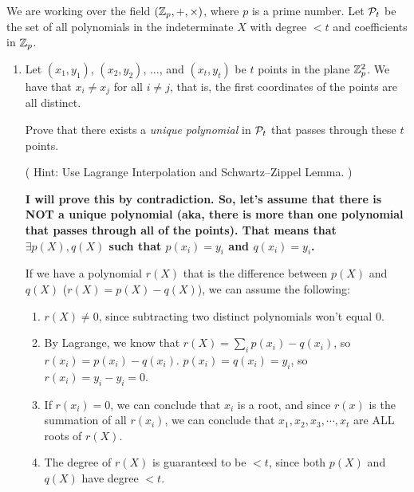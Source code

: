 \documentclass[11pt]{article}
\begin{document}
\begin{enumerate}
  We are working over the field $({\mathbb Z}_p,+,\times)$, where $p$ is a prime number. 
  Let ${\mathcal P}_t$ be the set of all polynomials in the indeterminate $X$ with degree $<t$ and coefficients in ${\mathbb Z}_p$. 
  
  \begin{enumerate}
  \item Let $(x_1,y_1)$, $(x_2,y_2)$, $\dotsc$, and $(x_t,y_t)$ be $t$ points in the plane ${\mathbb Z}_p^2$. 
    We have that $x_i \neq x_j$ for all $i\neq j$, that is, the first coordinates of the points are all distinct. 
    
    Prove that there exists a {\em unique polynomial} in ${\mathcal P}_t$ that passes through these $t$ points. 
    
    ({\footnotesize
      Hint: 
        Use Lagrange Interpolation and Schwartz--Zippel Lemma. 
    }%
    )\newline 
    {\bfseries
    \newline
    \newline
      I will prove this by contradiction. So, let's assume that there is NOT a unique polynomial (aka, there is more than one polynomial that passes through all of the points). That means that $\exists p(X), q(X)$ such that $p(x_i)=y_i$ and $q(x_i)=y_i$. \newline

      If we have a polynomial $r(X)$ that is the difference between $p(X)$ and $q(X)$ ($r(X) = p(X) - q(X)$), we can assume the following: \newline
      \begin{enumerate}
        \item $r(X) \neq 0$, since subtracting two distinct polynomials won't equal 0. \newline
        \item By Lagrange, we know that $r(X) = \sum_{i} p(x_i) - q(x_i)$, so $r(x_i) = p(x_i)-q(x_i)$. $p(x_i)=q(x_i)=y_i$, so $r(x_i)=y_i-y_i=0$. \newline
        \item If $r(x_i)=0$, we can conclude that $x_i$ is a root, and since $r(x)$ is the summation of all $r(x_i)$, we can conclude that $x_1, x_2, x_3, \dotsi, x_t$ are ALL roots of $r(X)$. \newline
        \item The degree of $r(X)$ is guaranteed to be $< t$, since both $p(X)$ and $q(X)$ have degree $< t$. \newline
      \end{enumerate}

}
\end{enumerate}
\end{enumerate}
\end{document}
